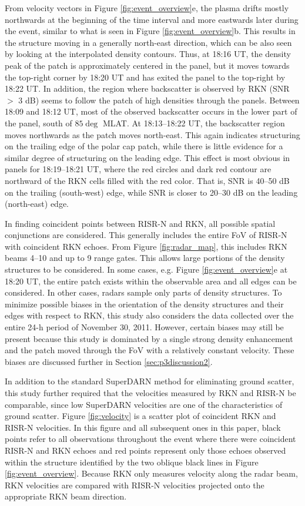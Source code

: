 From velocity vectors in Figure \ref{fig:event_overview}e, the plasma drifts mostly northwards at the beginning of the time interval and more eastwards later during the event, similar to what is seen in Figure \ref{fig:event_overview}b. This results in the structure moving in a generally north-east direction, which can be also seen by looking at the interpolated density contours.  Thus, at 18:16 UT, the density peak of the patch is approximately centered in the panel, but it moves towards the top-right corner by 18:20 UT and has exited the panel to the top-right by 18:22 UT. In addition, the region where backscatter is observed by RKN (SNR \(>\) 3 dB) seems to follow the patch of high densities through the panels.  Between 18:09 and 18:12 UT, most of the observed backscatter occurs in the lower part of the panel, south of \(85\deg\) MLAT.  At 18:13--18:22 UT, the backscatter region moves northwards as the patch moves north-east.  This again indicates structuring on the trailing edge of the polar cap patch, while there is little evidence for a similar degree of structuring on the leading edge.  This effect is most obvious in panels for 18:19--18:21 UT, where the red circles and dark red contour are northward of the RKN cells filled with the red color.  That is, SNR is 40--50 dB on the trailing (south-west) edge, while SNR is closer to 20--30 dB on the leading (north-east) edge.

In finding coincident points between RISR-N and RKN, all possible spatial conjunctions are considered.  This generally includes the entire FoV of RISR-N with coincident RKN echoes.  From Figure \ref{fig:radar_map}, this includes RKN beams 4--10 and up to 9 range gates.  This allows large portions of the density structures to be considered.  In some cases, e.g. Figure \ref{fig:event_overview}e at 18:20 UT, the entire patch exists within the observable area and all edges can be considered.  In other cases, radars sample only parts of density structures.  To minimize possible biases in the orientation of the density structures and their edges with respect to RKN, this study also considers the data collected over the entire 24-h period of November 30, 2011.  However, certain biases may still be present because this study is dominated by a single strong density enhancement and the patch moved through the FoV with a relatively constant velocity.  These biases are discussed further in Section \ref{sec:p3discussion2}.

\label{sec:velocity}
In addition to the standard SuperDARN method for eliminating ground scatter, this study further required that the velocities measured by RKN and RISR-N be comparable, since low SuperDARN velocities are one of the characteristics of ground scatter.  Figure \ref{fig:velocity} is a scatter plot of coincident RKN and RISR-N velocities.  In this figure and all subsequent ones in this paper, black points refer to all observations throughout the event where there were coincident RISR-N and RKN echoes and red points represent only those echoes observed within the structure identified by the two oblique black lines in Figure \ref{fig:event_overview}.  Because RKN only measures velocity along the radar beam, RKN velocities are compared with RISR-N velocities projected onto the appropriate RKN beam direction.

